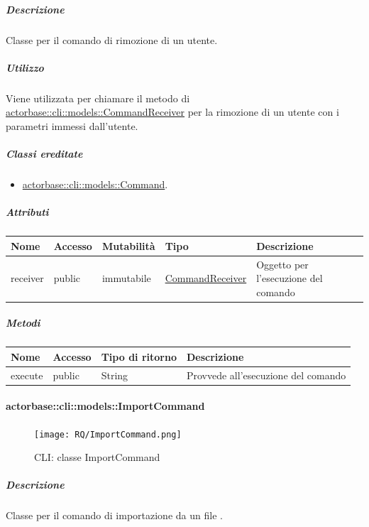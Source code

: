 \documentclass{scalatekids-article}
\begin{document}
\subparagraph{Descrizione}

Classe per il comando di rimozione di un utente.

\subparagraph{Utilizzo}

Viene utilizzata per chiamare il metodo di
\hyperref[sec:actorbase::cli::models::CommandReceiver]{actorbase::cli::models::CommandReceiver} per la rimozione di un utente con i
parametri immessi dall'utente.

\subparagraph{Classi ereditate}

\begin{itemize}
\item \hyperref[sec:actorbase::cli::models::Command]{actorbase::cli::models::Command}.
\end{itemize}

\subparagraph{Attributi}

\begin{tabular}{| p{1cm} | p{1.5cm} | p{2cm} | p{4cm} | p{8.5cm} |}
  \hline
  Nome & Accesso & Mutabilità & Tipo & Descrizione\\
  \hline
  receiver & public & immutabile & \hyperref[sec:actorbase::cli::models::CommandReceiver]{CommandReceiver} & Oggetto per l'esecuzione del comando\\
  \hline
\end{tabular}

\subparagraph{Metodi}

\begin{tabular}{| l | l | l | l |}
  \hline
  Nome & Accesso & Tipo di ritorno & Descrizione\\
  \hline
  execute & public & String & Provvede all'esecuzione del comando\\
  \hline
\end{tabular}

\paragraph{actorbase::cli::models::ImportCommand}
\label{sec:actorbase::cli::models::ImportCommand}

\begin{figure}[H]
  \begin{center}
    \texttt{[image: RQ/ImportCommand.png]}
    \caption{CLI: classe ImportCommand}
  \end{center}
\end{figure}

\subparagraph{Descrizione}

Classe per il comando di importazione da un file .
\end{document}
